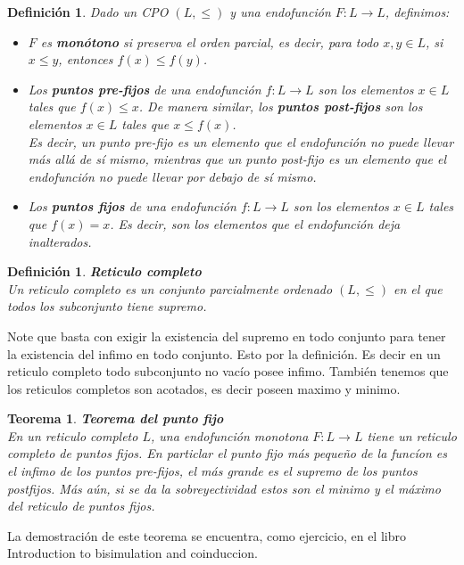\documentclass[executivepaper]{article}
\newtheorem{teo}[propo]{Teorema}
\newtheorem{defi}[propo]{Definición}
\begin{document}
\begin{defi}
    Dado un CPO $(L, \leq)$ y una endofunción $F: L \rightarrow L$, definimos:
    \begin{itemize}
        \item $F$ es \textbf{monótono} si preserva el orden parcial, es decir, para todo $x, y \in L$, si $x \leq y$, entonces $f(x) \leq f(y)$.
        \item Los \textbf{puntos pre-fijos} de una endofunción $f: L \rightarrow L$ son los elementos $x \in L$ tales que $f(x) \leq x$. De manera similar, los \textbf{puntos post-fijos} son los elementos $x \in L$ tales que $x \leq f(x)$.\\ 
        Es decir, un punto pre-fijo es un elemento que el endofunción no puede llevar más allá de sí mismo, mientras que un punto post-fijo es un elemento que el endofunción no puede llevar por debajo de sí mismo.
        \item Los \textbf{puntos fijos} de una endofunción $f: L \rightarrow L$ son los elementos $x \in L$ tales que $f(x) = x$. Es decir, son los elementos que el endofunción deja inalterados.
    \end{itemize} 
\end{defi}

\begin{defi}\textbf{Reticulo completo}\\
    Un reticulo completo es un conjunto parcialmente ordenado $(L,\leq)$ en el que todos los subconjunto tiene supremo.
\end{defi}
Note que basta con exigir la existencia del supremo en todo conjunto para tener la existencia del infimo en todo conjunto. Esto por la definición. Es decir en un reticulo completo todo subconjunto no vacío posee infimo. También tenemos que los reticulos completos son acotados, es decir poseen maximo y minimo.

\begin{teo}\textbf{Teorema del punto fijo}\\
    En un reticulo completo $L$, una endofunción monotona $F:L\rightarrow L$ tiene un reticulo completo de puntos fijos. En particlar el punto fijo más pequeño de la funcíon es el infimo de los puntos pre-fijos, el más grande es el supremo de los puntos postfijos. Más aún, si se da la sobreyectividad estos son el minimo y el máximo del reticulo de puntos fijos. 
\end{teo}
La demostración de este teorema se encuentra, como ejercicio, en el libro Introduction to bisimulation and coinduccion.
\end{document}
